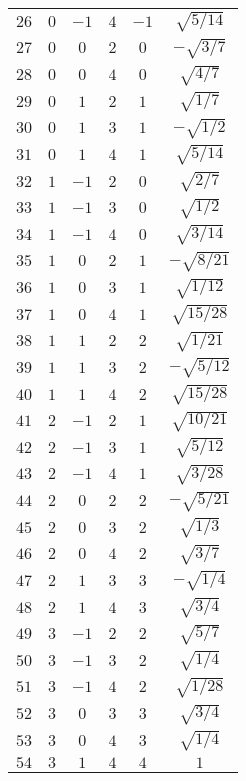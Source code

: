 \begin{table}
\begin{center}
\begin{tabular}{|c|c|c|c|c|c|}
$26$ & $0$ & $-1$ & $4$ & $-1$ & $\sqrt{5/14}$ \\ 
$27$ & $0$ & $0$ & $2$ & $0$ & $-\sqrt{3/7}$ \\ 
$28$ & $0$ & $0$ & $4$ & $0$ & $\sqrt{4/7}$ \\ 
$29$ & $0$ & $1$ & $2$ & $1$ & $\sqrt{1/7}$ \\ 
$30$ & $0$ & $1$ & $3$ & $1$ & $-\sqrt{1/2}$ \\ 
$31$ & $0$ & $1$ & $4$ & $1$ & $\sqrt{5/14}$ \\ 
$32$ & $1$ & $-1$ & $2$ & $0$ & $\sqrt{2/7}$ \\ 
$33$ & $1$ & $-1$ & $3$ & $0$ & $\sqrt{1/2}$ \\ 
$34$ & $1$ & $-1$ & $4$ & $0$ & $\sqrt{3/14}$ \\ 
$35$ & $1$ & $0$ & $2$ & $1$ & $-\sqrt{8/21}$ \\ 
$36$ & $1$ & $0$ & $3$ & $1$ & $\sqrt{1/12}$ \\ 
$37$ & $1$ & $0$ & $4$ & $1$ & $\sqrt{15/28}$ \\ 
$38$ & $1$ & $1$ & $2$ & $2$ & $\sqrt{1/21}$ \\ 
$39$ & $1$ & $1$ & $3$ & $2$ & $-\sqrt{5/12}$ \\ 
$40$ & $1$ & $1$ & $4$ & $2$ & $\sqrt{15/28}$ \\ 
$41$ & $2$ & $-1$ & $2$ & $1$ & $\sqrt{10/21}$ \\ 
$42$ & $2$ & $-1$ & $3$ & $1$ & $\sqrt{5/12}$ \\ 
$43$ & $2$ & $-1$ & $4$ & $1$ & $\sqrt{3/28}$ \\ 
$44$ & $2$ & $0$ & $2$ & $2$ & $-\sqrt{5/21}$ \\ 
$45$ & $2$ & $0$ & $3$ & $2$ & $\sqrt{1/3}$ \\ 
$46$ & $2$ & $0$ & $4$ & $2$ & $\sqrt{3/7}$ \\ 
$47$ & $2$ & $1$ & $3$ & $3$ & $-\sqrt{1/4}$ \\ 
$48$ & $2$ & $1$ & $4$ & $3$ & $\sqrt{3/4}$ \\ 
$49$ & $3$ & $-1$ & $2$ & $2$ & $\sqrt{5/7}$ \\ 
$50$ & $3$ & $-1$ & $3$ & $2$ & $\sqrt{1/4}$ \\ 
$51$ & $3$ & $-1$ & $4$ & $2$ & $\sqrt{1/28}$ \\ 
$52$ & $3$ & $0$ & $3$ & $3$ & $\sqrt{3/4}$ \\ 
$53$ & $3$ & $0$ & $4$ & $3$ & $\sqrt{1/4}$ \\ 
$54$ & $3$ & $1$ & $4$ & $4$ & $1$ \\ 
\hline 
\end{tabular}
\end{center}
\end{table}


